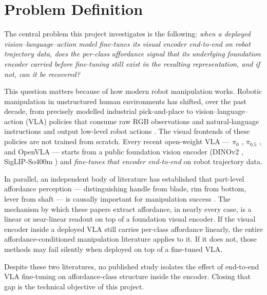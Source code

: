 \documentclass[11pt]{article}
\begin{document}
\vspace{1em}

\section{Problem Definition}
\label{sec:problem}

The central problem this project investigates is the following: \emph{when a
deployed vision--language--action model fine-tunes its visual encoder
end-to-end on robot trajectory data, does the per-class affordance signal
that its underlying foundation encoder carried before fine-tuning still
exist in the resulting representation, and if not, can it be recovered?}

This question matters because of how modern robot manipulation works.
Robotic manipulation in unstructured human environments has shifted, over
the past decade, from precisely modelled industrial pick-and-place to
vision--language--action (VLA) policies that consume raw RGB observations
and natural-language instructions and output low-level robot actions
\cite{kim2024openvla, black2024pi0}. The visual frontends of these
policies are not trained from scratch. Every recent open-weight VLA --- $\pi_0$
\cite{black2024pi0}, $\pi_{0.5}$ \cite{intelligence2024pi05}, and OpenVLA
\cite{kim2024openvla} --- starts from a public foundation vision encoder
(DINOv2 \cite{oquab2024dinov2}, SigLIP-So400m \cite{zhai2023sigmoid}) and
\textit{fine-tunes that encoder end-to-end} on robot trajectory data.

In parallel, an independent body of literature has established that
part-level affordance perception --- distinguishing handle from blade, rim
from bottom, lever from shaft --- is causally important for manipulation
success \cite{li2025affgrasp, tarad2024, turpin2021gift,
mandi2021graff, kokic2017affordance, fsd2026}. The mechanism by which
these papers extract affordance, in nearly every case, is a linear or
near-linear readout on top of a foundation visual encoder. If the
visual encoder inside a deployed VLA still carries per-class affordance
linearly, the entire affordance-conditioned manipulation literature
applies to it. If it does not, those methods may fail silently when
deployed on top of a fine-tuned VLA.

Despite these two literatures, no published study isolates the effect of
end-to-end VLA fine-tuning on affordance-class structure inside the
encoder. Closing that gap is the technical objective of this project.
\end{document}
